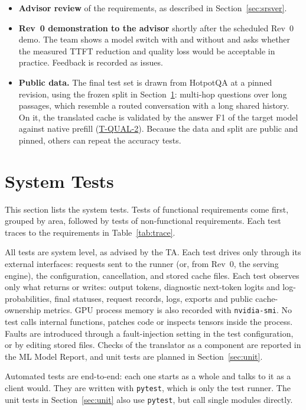 \documentclass[12pt, titlepage]{article}
\newcommand{\tref}[1]{\hyperref[test:#1]{#1}}
\begin{document}
\begin{itemize}
  \item \textbf{Advisor review} of the requirements, as described in
  Section~\ref{sec:srsver}.
  \item \textbf{Rev~0 demonstration to the advisor} shortly after the
  scheduled Rev~0 demo. The team shows a model switch with and without
  \progname{} and asks whether the measured TTFT reduction and quality loss
  would be acceptable in practice. Feedback is recorded as issues.
  \item \textbf{Public data.} The final test set is drawn from HotpotQA
  \citep{Yang2018HotpotQA} at a pinned revision, using the frozen split in
  Section~\ref{sec:system}: multi-hop questions over long passages, which
  resemble a routed conversation with a long shared history. On it, the
  translated cache is validated by the answer F1 of the target model against
  native prefill (\tref{T-QUAL-2}). Because the data and split are public
  and pinned, others can repeat the accuracy tests.
\end{itemize}

\section{System Tests}
\label{sec:system}

This section lists the system tests. Tests of functional requirements come
first, grouped by area, followed by tests of non-functional requirements.
Each test traces to the requirements in Table~\ref{tab:trace}.

All tests are system level, as advised by the TA. Each test drives
\progname{} only through its external interfaces: requests sent to the
runner (or, from Rev~0, the serving engine), the configuration, cancellation,
and stored cache files. Each test observes only what \progname{} returns or
writes: output tokens, diagnostic next-token logits and log-probabilities,
final statuses, request records, logs, exports and public cache-ownership
metrics. GPU process memory is also recorded with \texttt{nvidia-smi}.
No test calls internal functions, patches code or inspects tensors inside
the process. Faults are introduced through a fault-injection setting in the
test configuration, or by editing stored files. Checks of the translator as
a component are reported in the ML Model Report, and unit tests are planned
in Section~\ref{sec:unit}.

Automated tests are end-to-end: each one starts \progname{} as a whole and
talks to it as a client would. They are written with \texttt{pytest}, which
is only the test runner. The unit tests in Section~\ref{sec:unit} also use
\texttt{pytest}, but call single modules directly.
\end{document}
